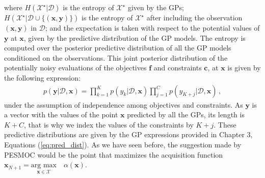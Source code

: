 where $H(\mathcal{X}^{\star}|\mathcal{D})$ is the entropy of $\mathcal{X}^\star$ given by the GPs; $H(\mathcal{X}^{\star}|\mathcal{D} \cup \{(\textbf{x},\textbf{y})\})$ is the entropy of $\mathcal{X}^\star$ after
including the observation $(\textbf{x},\textbf{y})$ in $\mathcal{D}$; and the expectation is taken
with respect to the potential values of $\mathbf{y}$ at $\mathbf{x}$, given by the predictive
distribution of the GP models. The entropy is computed over the posterior predictive distribution of all the GP models conditioned on the observations. This joint posterior distribution of the potentially
noisy evaluations of the objectives $\textbf{f}$ and constraints $\textbf{c}$, at $\mathbf{x}$ is given by the following expression:
\begin{align}
p(\textbf{y}|\mathcal{D},\textbf{x}) = \prod_{k=1}^{K}p(y_k|\mathcal{D},\textbf{x}) \prod_{j=1}^C p(y_{K+j}|\mathcal{D},\mathbf{x})\,,
\label{eq:prods}
\end{align}
under the assumption of independence among objectives and constraints. As $\mathbf{y}$ is a vector with the values of the point $\mathbf{x}$ predicted by all the GPs, its length is $K+C$, that is why we index the values of the constraints by $K+j$. These predictive distributions are given by the GP expressions provided in Chapter 3, Equations (\ref{eq:pred_dist}). As we have seen before, the suggestion made by PESMOC would be the point that maximizes the acquisition function $\mathbf{x}_{N+1} = \underset{\mathbf{x}\in\mathcal{X}}{\text{arg max}}\quad \alpha(\mathbf{x})$. 

